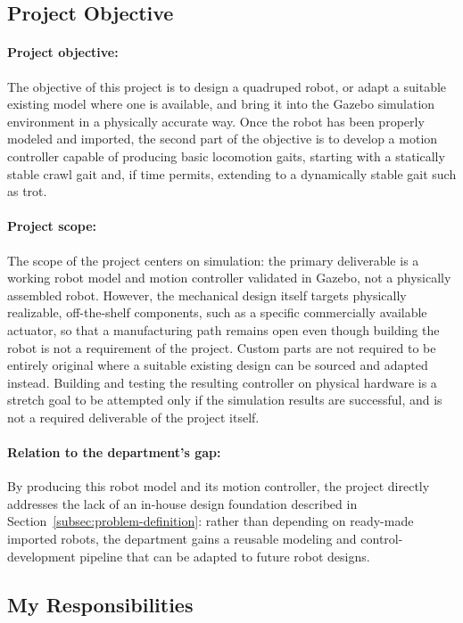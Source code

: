 \documentclass[12pt]{article}
\begin{document}
\subsection{Project Objective}
\label{subsec:project-objective}
\paragraph{Project objective:} The objective of this project is to design a quadruped robot, or adapt a suitable existing model where one is available, and bring it into the Gazebo simulation environment in a physically accurate way. Once the robot has been properly modeled and imported, the second part of the objective is to develop a motion controller capable of producing basic locomotion gaits, starting with a statically stable crawl gait and, if time permits, extending to a dynamically stable gait such as trot.
\paragraph{Project scope:} The scope of the project centers on simulation: the primary deliverable is a working robot model and motion controller validated in Gazebo, not a physically assembled robot. However, the mechanical design itself targets physically realizable, off-the-shelf components, such as a specific commercially available actuator, so that a manufacturing path remains open even though building the robot is not a requirement of the project. Custom parts are not required to be entirely original where a suitable existing design can be sourced and adapted instead. Building and testing the resulting controller on physical hardware is a stretch goal to be attempted only if the simulation results are successful, and is not a required deliverable of the project itself.
\paragraph{Relation to the department's gap:} By producing this robot model and its motion controller, the project directly addresses the lack of an in-house design foundation described in Section~\ref{subsec:problem-definition}: rather than depending on ready-made imported robots, the department gains a reusable modeling and control-development pipeline that can be adapted to future robot designs.

\subsection{My Responsibilities}
\label{subsec:responsibilities}
\end{document}
